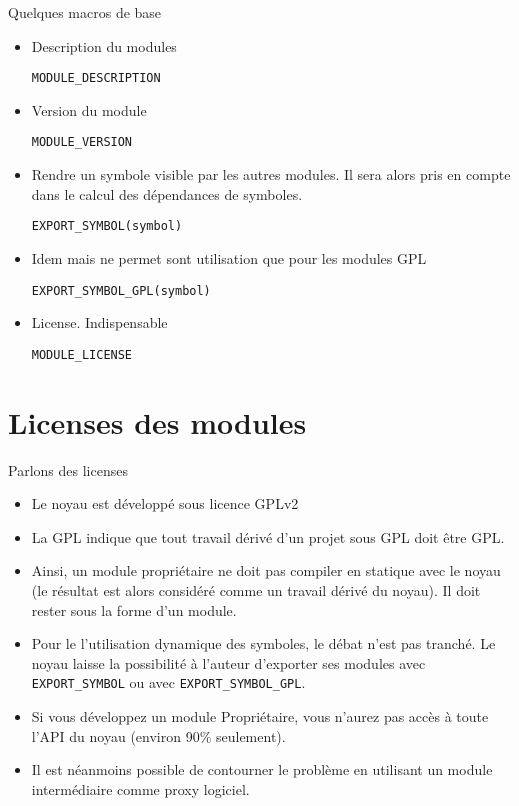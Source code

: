 \begin{frame}[fragile=singleslide]{Quelques macros de base}
  \begin{itemize} 
  \item Description du modules
    \begin{lstlisting}
MODULE_DESCRIPTION
    \end{lstlisting}
  \item Version du module
    \begin{lstlisting}
MODULE_VERSION
    \end{lstlisting}
  \item Rendre un symbole visible par les autres modules.  Il sera alors
    pris en compte dans le calcul des dépendances de symboles.
    \begin{lstlisting}
EXPORT_SYMBOL(symbol)
    \end{lstlisting} 
  \item Idem  mais  ne permet sont utilisation que
    pour les modules GPL
    \begin{lstlisting}
EXPORT_SYMBOL_GPL(symbol)
    \end{lstlisting} 
  \item License. Indispensable
    \begin{lstlisting}
MODULE_LICENSE
    \end{lstlisting}
  \end{itemize}
\end{frame}

\section{Licenses des modules}

\begin{frame}[fragile=singleslide]{Parlons des licenses}
  \begin{itemize} 
  \item Le noyau est développé sous licence GPLv2
  \item La  GPL indique que tout  travail dérivé d'un  projet sous GPL
    doit être GPL.
  \item Ainsi, un module propriétaire ne doit pas compiler en statique
    avec le  noyau (le résultat  est alors considéré comme  un travail
    dérivé du noyau). Il doit rester sous la forme d'un module.
  \item Pour  le l'utilisation dynamique des symboles,  le débat n'est
    pas tranché.  Le noyau laisse la possibilité à l'auteur d'exporter
    ses     modules      avec     \verb+EXPORT_SYMBOL+     ou     avec
    \verb+EXPORT_SYMBOL_GPL+.
  \item Si  vous développez un  module Propriétaire, vous  n'aurez pas
    accès à toute l'API du noyau (environ 90\% seulement).
  \item  Il  est  néanmoins  possible  de contourner  le  problème  en
    utilisant un module intermédiaire comme proxy logiciel.
  \end{itemize} 
\end{frame}

